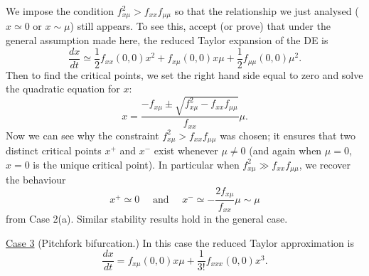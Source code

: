 \documentclass[11pt, letterpaper, oneside]{article}     %
\numberwithin{equation}{subsection}
\theoremstyle{definition}
\numberwithin{theorem}{section}
\theoremstyle{remark}
\begin{document}
\begin{enumerate}
  We impose the condition $f_{x\mu}^2 > f_{xx}f_{\mu\mu}$ so that the relationship we just analysed ($x \simeq 0$ or $x\sim \mu$) still appears. To see this, accept (or prove) that under the general assumption made here, the reduced Taylor expansion of the DE is
  \begin{equation}
    \frac{dx}{dt} \simeq \frac{1}{2}f_{xx}(0,0)x^2 + f_{x\mu}(0,0)x\mu + \frac{1}{2}f_{\mu\mu}(0,0)\mu^2.
  \end{equation}
  Then to find the critical points, we set the right hand side equal to zero and solve the quadratic equation for $x$:
  \begin{equation}
    x = \frac{-f_{x\mu} \pm \sqrt{f_{x\mu}^2 - f_{xx}f_{\mu\mu}}}{f_{xx}}\mu.
  \end{equation}
  Now we can see why the constraint $f_{x\mu}^2 > f_{xx}f_{\mu\mu}$ was chosen; it ensures that two distinct critical points $x^+$ and $x^-$ exist whenever $\mu \neq 0$ (and again when $\mu = 0$, $x = 0$ is the unique critical point). In particular when $f_{x\mu}^2 \gg f_{xx}f_{\mu\mu}$, we recover the behaviour
  \begin{equation}
    x^+ \simeq 0\quad\text{ and }\quad
    x^- \simeq -\frac{2f_{x\mu}}{f_{xx}}\mu \sim \mu
  \end{equation}
  from Case 2(a). Similar stability results hold in the general case.

  \medskip

  \underline{Case 3} (Pitchfork bifurcation.) In this case the reduced Taylor approximation is
  \begin{equation}
    \frac{dx}{dt} = f_{x\mu}(0,0)x\mu + \frac{1}{3!}f_{xxx}(0,0)x^3.
  \end{equation}


\end{enumerate}
\end{document}
